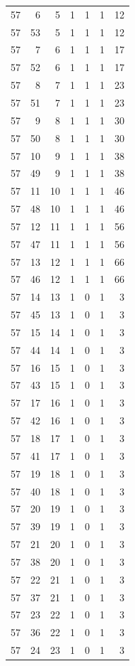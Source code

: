 \begin{longtable}{rrrrrrr}
57 & 6 & 5 & 1 & 1 & 1 & 12\\
57 & 53 & 5 & 1 & 1 & 1 & 12\\
57 & 7 & 6 & 1 & 1 & 1 & 17\\
57 & 52 & 6 & 1 & 1 & 1 & 17\\
57 & 8 & 7 & 1 & 1 & 1 & 23\\
57 & 51 & 7 & 1 & 1 & 1 & 23\\
57 & 9 & 8 & 1 & 1 & 1 & 30\\
57 & 50 & 8 & 1 & 1 & 1 & 30\\
57 & 10 & 9 & 1 & 1 & 1 & 38\\
57 & 49 & 9 & 1 & 1 & 1 & 38\\
57 & 11 & 10 & 1 & 1 & 1 & 46\\
57 & 48 & 10 & 1 & 1 & 1 & 46\\
57 & 12 & 11 & 1 & 1 & 1 & 56\\
57 & 47 & 11 & 1 & 1 & 1 & 56\\
57 & 13 & 12 & 1 & 1 & 1 & 66\\
57 & 46 & 12 & 1 & 1 & 1 & 66\\
57 & 14 & 13 & 1 & 0 & 1 & 3\\
57 & 45 & 13 & 1 & 0 & 1 & 3\\
57 & 15 & 14 & 1 & 0 & 1 & 3\\
57 & 44 & 14 & 1 & 0 & 1 & 3\\
57 & 16 & 15 & 1 & 0 & 1 & 3\\
57 & 43 & 15 & 1 & 0 & 1 & 3\\
57 & 17 & 16 & 1 & 0 & 1 & 3\\
57 & 42 & 16 & 1 & 0 & 1 & 3\\
57 & 18 & 17 & 1 & 0 & 1 & 3\\
57 & 41 & 17 & 1 & 0 & 1 & 3\\
57 & 19 & 18 & 1 & 0 & 1 & 3\\
57 & 40 & 18 & 1 & 0 & 1 & 3\\
57 & 20 & 19 & 1 & 0 & 1 & 3\\
57 & 39 & 19 & 1 & 0 & 1 & 3\\
57 & 21 & 20 & 1 & 0 & 1 & 3\\
57 & 38 & 20 & 1 & 0 & 1 & 3\\
57 & 22 & 21 & 1 & 0 & 1 & 3\\
57 & 37 & 21 & 1 & 0 & 1 & 3\\
57 & 23 & 22 & 1 & 0 & 1 & 3\\
57 & 36 & 22 & 1 & 0 & 1 & 3\\
57 & 24 & 23 & 1 & 0 & 1 & 3\\

\end{longtable}
